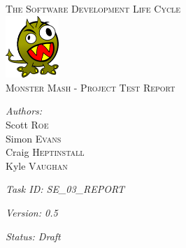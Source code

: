 \documentclass[a4paper]{article}
\begin{document}
\pagestyle{fancy}
\begin{center}
\textsc{\LARGE The Software Development Life Cycle}\\[1.5cm]\includegraphics[width=0.15\textwidth]{img/monster.png}\\[1.5cm] %
\textsc{\Large Monster Mash - Project Test Report}\\[0.5cm] %

\begin{minipage}{0.8\textwidth}
\begin{flushleft} \large
\emph{Authors:}\\
Scott \textsc{Roe}\\
Simon \textsc{Evans}\\
Craig \textsc{Heptinstall}\\
Kyle \textsc{Vaughan}\\
\end{flushleft}
\end{minipage}
\vspace{8 mm}

\begin{minipage}{0.8\textwidth}
\begin{flushleft} \large
\emph{Task ID: SE\_03\_REPORT}
\end{flushleft}
\end{minipage}
\vspace{8 mm}

\begin{minipage}{0.8\textwidth}
\begin{flushleft} \large
\emph{Version: 0.5}
\end{flushleft}
\end{minipage}
\vspace{8 mm}

\begin{minipage}{0.8\textwidth}
\begin{flushleft} \large
\emph{Status: Draft}
\end{flushleft}
\end{minipage}
\vspace{8 mm}


\end{center}
\end{document}
